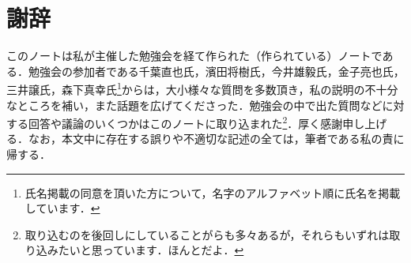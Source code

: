 \section*{謝辞}

このノートは私が主催した勉強会を経て作られた（作られている）ノートである．勉強会の参加者である千葉直也氏，濱田将樹氏，今井雄毅氏，金子亮也氏，三井譲氏，森下真幸氏\footnote{氏名掲載の同意を頂いた方について，名字のアルファベット順に氏名を掲載しています．}からは，大小様々な質問を多数頂き，私の説明の不十分なところを補い，また話題を広げてくださった．勉強会の中で出た質問などに対する回答や議論のいくつかはこのノートに取り込まれた\footnote{取り込むのを後回しにしていることがらも多々あるが，それらもいずれは取り込みたいと思っています．ほんとだよ．}．厚く感謝申し上げる．なお，本文中に存在する誤りや不適切な記述の全ては，筆者である私の責に帰する．